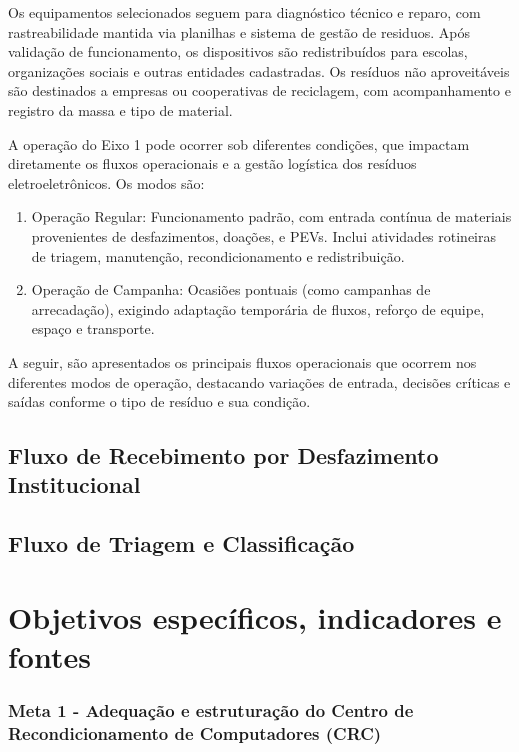 \documentclass[
	12pt,				%
	openright,			%
	twoside,			%
	a4paper,			%
	english,			%
	french,				%
	spanish,			%
	brazil,				%
	]{abntex2}
\begin{document}
Os equipamentos selecionados seguem para diagnóstico técnico e reparo, com rastreabilidade mantida via planilhas e sistema de gestão de residuos. Após validação de funcionamento, os dispositivos são redistribuídos para escolas, organizações sociais e outras entidades cadastradas. Os resíduos não aproveitáveis são destinados a empresas ou cooperativas de reciclagem, com acompanhamento e registro da massa e tipo de material.

A operação do Eixo 1 pode ocorrer sob diferentes condições, que impactam diretamente os fluxos operacionais e a gestão logística dos resíduos eletroeletrônicos. Os modos são:

\begin{enumerate}
  \item Operação Regular: Funcionamento padrão, com entrada contínua de materiais provenientes de desfazimentos, doações, e PEVs. Inclui atividades rotineiras de triagem, manutenção, recondicionamento e redistribuição.
  \item Operação de Campanha: Ocasiões pontuais (como campanhas de arrecadação), exigindo adaptação temporária de fluxos, reforço de equipe, espaço e transporte.
\end{enumerate}

A seguir, são apresentados os principais fluxos operacionais que ocorrem nos diferentes modos de operação, destacando variações de entrada, decisões críticas e saídas conforme o tipo de resíduo e sua condição.

\subsection*{Fluxo de Recebimento por Desfazimento Institucional}

\subsection*{Fluxo de Triagem e Classificação}

\section{Objetivos específicos, indicadores e fontes}
\subsubsection*{Meta 1 - Adequação e estruturação do Centro de Recondicionamento de Computadores (CRC)}
\end{document}
